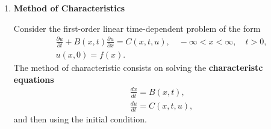 \begin{enumerate}
% 
% 
% 

\item \textbf{Method of Characteristics}

Consider the first-order linear time-dependent problem of the form
\[
\begin{aligned}
    & \frac{\partial u}{\partial t} + B(x,t)\frac{\partial u}{\partial x} = C(x,t,u) , \quad -\infty<x<\infty, \quad t>0, \\
    & u(x,0)=f(x).
\end{aligned}
\]
The method of characteristic consists on solving the \textbf{characteristc equations}
\[
\begin{aligned}
    & \frac{d x}{d t} = B(x,t),\\
    & \frac{d u}{d t} = C(x,t,u),
\end{aligned}
\]
and then using the initial condition.



\end{enumerate}
